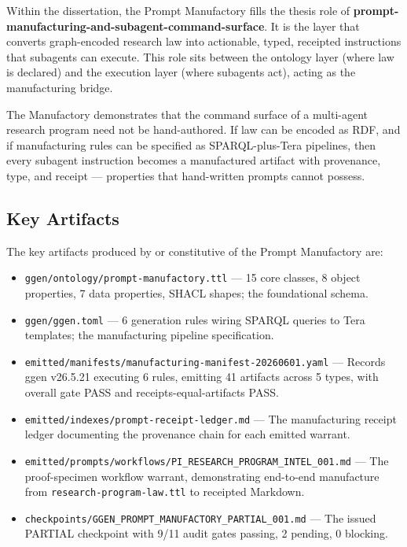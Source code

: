 Within the dissertation, the Prompt Manufactory fills the thesis role of
\textbf{prompt-manufacturing-and-subagent-command-surface}. It is the layer that converts
graph-encoded research law into actionable, typed, receipted instructions that subagents
can execute. This role sits between the ontology layer (where law is declared) and the
execution layer (where subagents act), acting as the manufacturing bridge.

The Manufactory demonstrates that the command surface of a multi-agent research program
need not be hand-authored. If law can be encoded as RDF, and if manufacturing rules can
be specified as SPARQL-plus-Tera pipelines, then every subagent instruction becomes a
manufactured artifact with provenance, type, and receipt --- properties that hand-written
prompts cannot possess.

\subsection{Key Artifacts}
\label{sec:research-prompt-manufactory-identity-artifacts}

The key artifacts produced by or constitutive of the Prompt Manufactory are:

\begin{itemize}
  \item \texttt{ggen/ontology/prompt-manufactory.ttl} --- 15 core classes, 8 object
    properties, 7 data properties, SHACL shapes; the foundational schema.
  \item \texttt{ggen/ggen.toml} --- 6 generation rules wiring SPARQL queries to Tera
    templates; the manufacturing pipeline specification.
  \item \texttt{emitted/manifests/manufacturing-manifest-20260601.yaml} --- Records ggen
    v26.5.21 executing 6 rules, emitting 41 artifacts across 5 types, with overall gate
    PASS and receipts-equal-artifacts PASS.
  \item \texttt{emitted/indexes/prompt-receipt-ledger.md} --- The manufacturing receipt
    ledger documenting the provenance chain for each emitted warrant.
  \item \texttt{emitted/prompts/workflows/PI\_RESEARCH\_PROGRAM\_INTEL\_001.md} --- The
    proof-specimen workflow warrant, demonstrating end-to-end manufacture from
    \texttt{research-program-law.ttl} to receipted Markdown.
  \item \texttt{checkpoints/GGEN\_PROMPT\_MANUFACTORY\_PARTIAL\_001.md} --- The issued
    PARTIAL checkpoint with 9/11 audit gates passing, 2 pending, 0 blocking.
\end{itemize}
